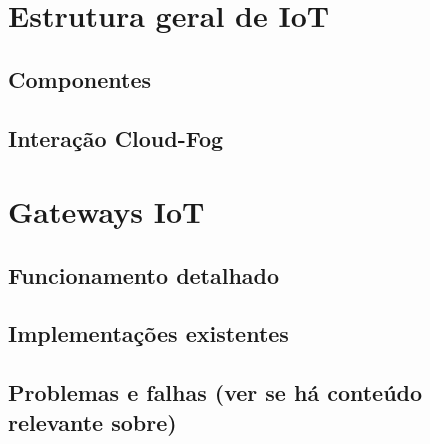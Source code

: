 \documentclass{report}
\title{\todo{A gente descobre depois}}
\author{João Gabriel Trombeta\\
        João Paulo Taylor Ienczak Zanette\\
        Ranieri Schroeder Althoff}
\date{\today}
\newcommand{\todo}[1]{{\color{red} #1}}
\begin{document}
\maketitle

\tableofcontents

\chapter{Estrutura geral de IoT}

\section{Componentes}

\section{Interação Cloud-Fog}

\chapter{Gateways IoT}

\section{Funcionamento detalhado}

\section{Implementações existentes}

\section{Problemas e falhas \todo{(ver se há conteúdo relevante sobre)}}


\nocite{*}

\end{document}
